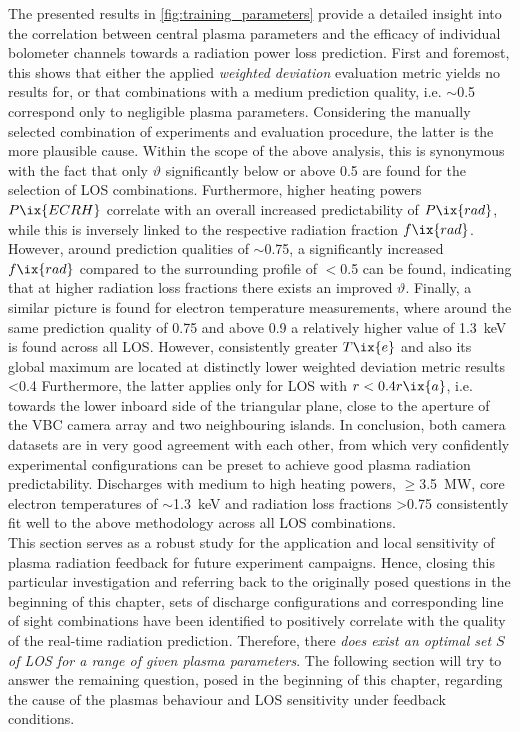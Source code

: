             The presented results in \cref{fig:training_parameters} provide a detailed insight into the correlation between central plasma parameters and the efficacy of individual bolometer channels towards a radiation power loss prediction. First and foremost, this shows that either the applied \textit{weighted deviation} evaluation metric yields no results for, or that combinations with a medium prediction quality, i.e. $\sim$\SI{0.5}{\arbitraryunit} correspond only to negligible plasma parameters. Considering the manually selected combination of experiments and evaluation procedure, the latter is the more plausible cause.  Within the scope of the above analysis, this is synonymous with the fact that only $\vartheta$ significantly below or above \SI{0.5}{\arbitraryunit} are found for the selection of LOS combinations. Furthermore, higher heating powers $P\ix{ECRH}$ correlate with an overall increased predictability of $P\ix{rad}$, while this is inversely linked to the respective radiation fraction $f\ix{rad}$. However, around prediction qualities of $\sim$\SI{0.75}{\arbitraryunit}, a significantly increased $f\ix{rad}$ compared to the surrounding profile of $<$\SI{0.5}{\arbitraryunit} can be found, indicating that at higher radiation loss fractions there exists an improved $\vartheta$. Finally, a similar picture is found for electron temperature measurements, where around the same prediction quality of \SI{0.75}{\arbitraryunit} and above \SI{0.9}{\arbitraryunit} a relatively higher value of \SI{1.3}{\kilo\electronvolt} is found across all LOS. However, consistently greater $T\ix{e}$ and also its global maximum are located at distinctly lower weighted deviation metric results <\SI{0.4}{\arbitraryunit} Furthermore, the latter applies only for LOS with $r<0.4r\ix{a}$, i.e. towards the lower inboard side of the triangular plane, close to the aperture of the VBC camera array and two neighbouring islands. In conclusion, both camera datasets are in very good agreement with each other, from which very confidently experimental configurations can be preset to achieve good plasma radiation predictability. Discharges with medium to high heating powers, $\ge$\SI{3.5}{\mega\watt}, core electron temperatures of $\sim$\SI{1.3}{\kilo\electronvolt} and radiation loss fractions >\SI{0.75}{\arbitraryunit} consistently fit well to the above methodology across all LOS combinations.\\%
%
            \newline%
            This section serves as a robust study for the application and local sensitivity of plasma radiation feedback for future experiment campaigns. Hence, closing this particular investigation and referring back to the originally posed questions in the beginning of this chapter, sets of discharge configurations and corresponding line of sight combinations have been identified to positively correlate with the quality of the real-time radiation prediction. Therefore, there \textit{does exist an optimal set $S$ of LOS for a range of given plasma parameters}. The following section will try to answer the remaining question, posed in the beginning of this chapter, regarding the cause of the plasmas behaviour and LOS sensitivity under feedback conditions.%
%

